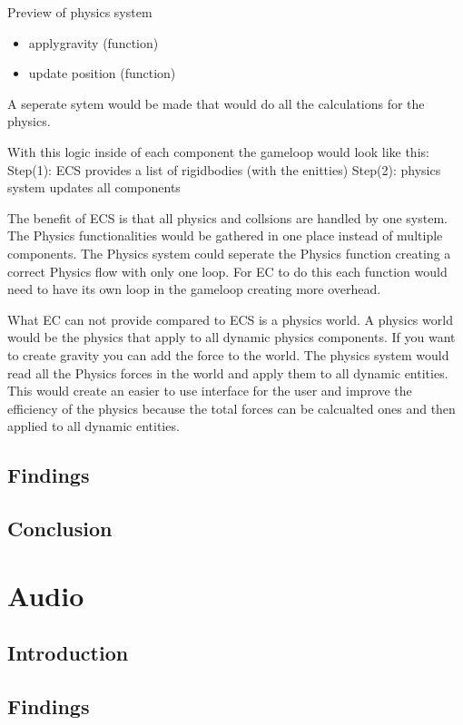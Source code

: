 \documentclass{projdoc}
\begin{document}
Preview of physics system
\begin{itemize}
	\item applygravity (function)
	\item update position (function)
\end{itemize}

A seperate sytem would be made that would do all the calculations for the physics.

With this logic inside of each component the gameloop would look like this:
Step(1): ECS provides a list of rigidbodies (with the enitties)
Step(2): physics system updates all components

The benefit of ECS is that all physics and collsions are handled by one system. The Physics functionalities would be gathered in one place instead of multiple components. The Physics system could seperate the Physics function creating a correct Physics flow with only one loop. For EC to do this each function would need to have its own loop in the gameloop creating more overhead.

What EC can not provide compared to ECS is a physics world. A physics world would be the physics that apply to all dynamic physics components. If you want to create gravity you can add the force to the world. The physics system would read all the Physics forces in the world and apply them to all dynamic entities. This would create an easier to use interface for the user and improve the efficiency of the physics because the total forces can be calcualted ones and then applied to all dynamic entities.




\subsection{Findings}

\subsection{Conclusion}

\section{Audio}

\subsection{Introduction}

\subsection{Findings}
\end{document}

